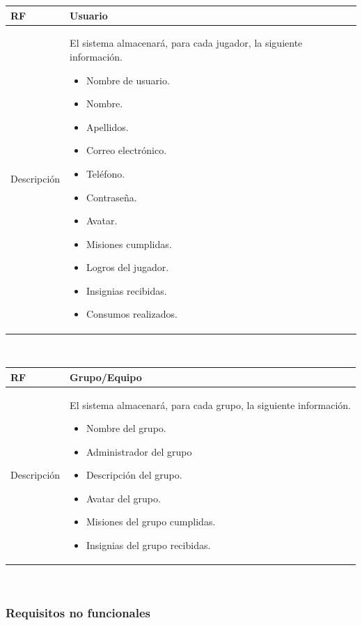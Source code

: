 \documentclass[twoside]{report}
\newcommand\addrow[2]{#1 &#2\\ }
\newcommand\addheading[2]{#1 &#2\\ \hline}
\newcommand\tabularhead{\begin{tabular}{lp{0.7\textwidth}}
\hline
}
\newenvironment{req}{\tabularhead}
{\hline\end{tabular}}
\begin{document}
\begin{req}
	\addheading{\textbf{RF\arabic{functionalRequirements}}}{Usuario}
	\addrow{Descripción}{
	El sistema almacenará, para cada jugador, la siguiente información.
	\begin{multicols}{2}
	\begin{itemize}
		\item Nombre de usuario.
		\item Nombre.
		\item Apellidos.
		\item Correo electrónico.
		\item Teléfono.
		\item Contraseña.
		\item Avatar.
		\item Misiones cumplidas.
		\item Logros del jugador.
		\item Insignias recibidas.
		\item Consumos realizados.
	\end{itemize}
	\end{multicols}
	}
\end{req}\\

\begin{req}
	\addheading{\textbf{RF\arabic{functionalRequirements}}}{Grupo/Equipo}
	\addrow{Descripción}{
	El sistema almacenará, para cada grupo, la siguiente información.
	\begin{multicols}{2}
	\begin{itemize}
		\item Nombre del grupo.
		\item Administrador del grupo
		\item Descripción del grupo.
		\item Avatar del grupo.
		\item Misiones del grupo cumplidas.
		\item Insignias del grupo recibidas.
	\end{itemize}
	\end{multicols}
	}
\end{req}\\

\subsubsection{Requisitos no funcionales}
\end{document}

